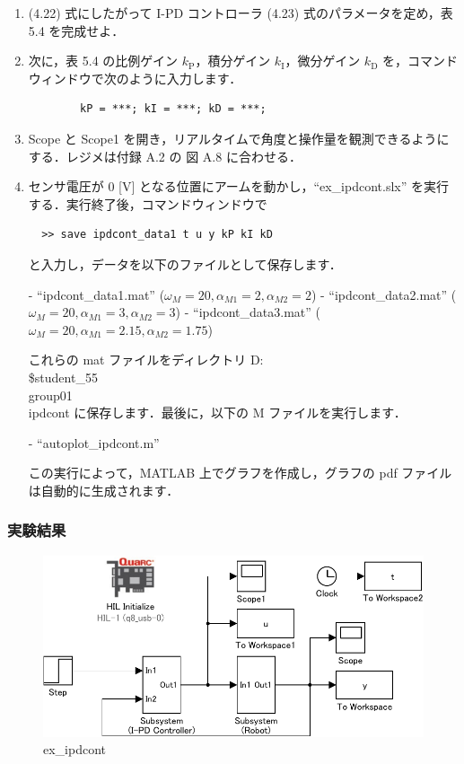 \begin{enumerate}
  \item (4.22) 式にしたがって I-PD コントローラ (4.23) 式のパラメータを定め，表 5.4 を完成せよ．
        
  \item 次に，表 5.4 の比例ゲイン $k_{\mathrm{P}}$，積分ゲイン $k_{\mathrm{I}}$，微分ゲイン $k_{\mathrm{D}}$ を，コマンドウィンドウで次のように入力します．
        \begin{verbatim}
        kP = ***; kI = ***; kD = ***;
        \end{verbatim}
        
  \item Scope と Scope1 を開き，リアルタイムで角度と操作量を観測できるようにする．レジメは付録 A.2 の 図 A.8 に合わせる．
        
  \item センサ電圧が 0 [V] となる位置にアームを動かし，“ex\_ipdcont.slx” を実行する．実行終了後，コマンドウィンドウで
        \begin{verbatim}
  >> save ipdcont_data1 t u y kP kI kD
  \end{verbatim}
        と入力し，データを以下のファイルとして保存します．
        
        - “ipdcont\_data1.mat” ($\omega_M = 20, \alpha_{M1} = 2, \alpha_{M2} = 2$)
        - “ipdcont\_data2.mat” ($\omega_M = 20, \alpha_{M1} = 3, \alpha_{M2} = 3$)
        - “ipdcont\_data3.mat” ($\omega_M = 20, \alpha_{M1} = 2.15, \alpha_{M2} = 1.75$)
        
        これらの mat ファイルをディレクトリ D:\\\$student\_55\\group01\\ipdcont に保存します．最後に，以下の M ファイルを実行します．
        
        - “autoplot\_ipdcont.m”
        
        この実行によって，MATLAB 上でグラフを作成し，グラフの pdf ファイルは自動的に生成されます．
\end{enumerate}

\subsubsection{実験結果}
\begin{figure}[h]
  \centering
  \includegraphics[scale=1]{sozai/ex_ipdcont-crop.pdf}
  \caption{ex\_ipdcont}
\end{figure}

